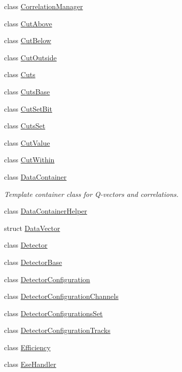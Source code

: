 \begin{DoxyCompactItemize}
class \mbox{\hyperlink{classQn_1_1CorrelationManager}{Correlation\+Manager}}
\item 
class \mbox{\hyperlink{classQn_1_1CutAbove}{Cut\+Above}}
\item 
class \mbox{\hyperlink{classQn_1_1CutBelow}{Cut\+Below}}
\item 
class \mbox{\hyperlink{classQn_1_1CutOutside}{Cut\+Outside}}
\item 
class \mbox{\hyperlink{classQn_1_1Cuts}{Cuts}}
\item 
class \mbox{\hyperlink{classQn_1_1CutsBase}{Cuts\+Base}}
\item 
class \mbox{\hyperlink{classQn_1_1CutSetBit}{Cut\+Set\+Bit}}
\item 
class \mbox{\hyperlink{classQn_1_1CutsSet}{Cuts\+Set}}
\item 
class \mbox{\hyperlink{classQn_1_1CutValue}{Cut\+Value}}
\item 
class \mbox{\hyperlink{classQn_1_1CutWithin}{Cut\+Within}}
\item 
class \mbox{\hyperlink{classQn_1_1DataContainer}{Data\+Container}}
\begin{DoxyCompactList}\small\item\em Template container class for Q-\/vectors and correlations. \end{DoxyCompactList}\item 
class \mbox{\hyperlink{classQn_1_1DataContainerHelper}{Data\+Container\+Helper}}
\item 
struct \mbox{\hyperlink{structQn_1_1DataVector}{Data\+Vector}}
\item 
class \mbox{\hyperlink{classQn_1_1Detector}{Detector}}
\item 
class \mbox{\hyperlink{classQn_1_1DetectorBase}{Detector\+Base}}
\item 
class \mbox{\hyperlink{classQn_1_1DetectorConfiguration}{Detector\+Configuration}}
\item 
class \mbox{\hyperlink{classQn_1_1DetectorConfigurationChannels}{Detector\+Configuration\+Channels}}
\item 
class \mbox{\hyperlink{classQn_1_1DetectorConfigurationsSet}{Detector\+Configurations\+Set}}
\item 
class \mbox{\hyperlink{classQn_1_1DetectorConfigurationTracks}{Detector\+Configuration\+Tracks}}
\item 
class \mbox{\hyperlink{classQn_1_1Efficiency}{Efficiency}}
\item 
class \mbox{\hyperlink{classQn_1_1EseHandler}{Ese\+Handler}}
\item 

\end{DoxyCompactItemize}
